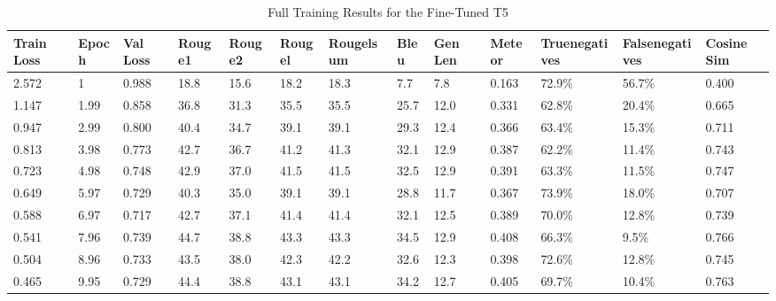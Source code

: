 \begin{appendices}
\begin{table}[!ht]
\begin{adjustwidth}{-1.8cm}{}
  \centering
  \begin{tabular}{p{0.8cm}|l|p{0.8cm}|l|l|l|p{1.1cm}|l|p{0.7cm}|l|p{1.5cm}|p{1.5cm}|p{1.2cm}}
        \textbf{Train Loss} & \textbf{Epoch} & \textbf{Val Loss} & \textbf{Rouge1} & \textbf{Rouge2} & \textbf{Rougel} & \textbf{Rougelsum} & \textbf{Bleu} & \textbf{Gen Len} & \textbf{Meteor} & \textbf{True\newline negatives} & \textbf{False\newline negatives} & \textbf{Cosine Sim} \\ \hline
        2.572 & 1 & 0.988 & 18.8 & 15.6 & 18.2 & 18.3 & 7.7 & 7.8 & 0.163 & 72.9\% & 56.7\% & 0.400 \\ \hline
        1.147 & 1.99 & 0.858 & 36.8 & 31.3 & 35.5 & 35.5 & 25.7 & 12.0 & 0.331 & 62.8\% & 20.4\% & 0.665 \\ \hline
        0.947 & 2.99 & 0.800 & 40.4 & 34.7 & 39.1 & 39.1 & 29.3 & 12.4 & 0.366 & 63.4\% & 15.3\% & 0.711 \\ \hline
        0.813 & 3.98 & 0.773 & 42.7 & 36.7 & 41.2 & 41.3 & 32.1 & 12.9 & 0.387 & 62.2\% & 11.4\% & 0.743 \\ \hline
        0.723 & 4.98 & 0.748 & 42.9 & 37.0 & 41.5 & 41.5 & 32.5 & 12.9 & 0.391 & 63.3\% & 11.5\% & 0.747 \\ \hline
        0.649 & 5.97 & 0.729 & 40.3 & 35.0 & 39.1 & 39.1 & 28.8 & 11.7 & 0.367 & 73.9\% & 18.0\% & 0.707 \\ \hline
        0.588 & 6.97 & 0.717 & 42.7 & 37.1 & 41.4 & 41.4 & 32.1 & 12.5 & 0.389 & 70.0\% & 12.8\% & 0.739 \\ \hline
        0.541 & 7.96 & 0.739 & 44.7 & 38.8 & 43.3 & 43.3 & 34.5 & 12.9 & 0.408 & 66.3\% & 9.5\% & 0.766 \\ \hline
        0.504 & 8.96 & 0.733 & 43.5 & 38.0 & 42.3 & 42.2 & 32.6 & 12.3 & 0.398 & 72.6\% & 12.8\% & 0.745 \\ \hline
        0.465 & 9.95 & 0.729 & 44.4 & 38.8 & 43.1 & 43.1 & 34.2 & 12.7 & 0.405 & 69.7\% & 10.4\% & 0.763 \\
  \end{tabular}
  \caption{Full Training Results for the Fine-Tuned T5}
  \label{tab:longheaders}
\end{adjustwidth}
\end{table}


\end{appendices}